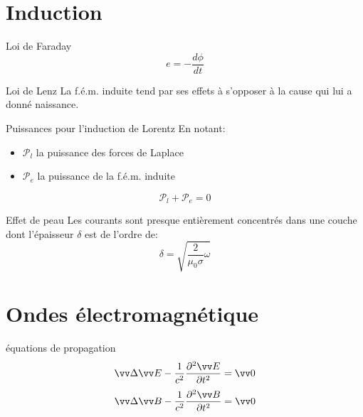 \documentclass[french, a4paper, 11pt, twocolumn]{article}
\begin{document}
\section{Induction}
\begin{cadre}{Loi de Faraday}
  \[e = -\dfrac{d\phi}{dt}\]
\end{cadre}

\begin{cadre}{Loi de Lenz}
  \og La f.é.m. induite tend par ses effets à s'opposer à la cause qui lui a donné naissance.\fg{}
\end{cadre}

\begin{cadre}{Puissances pour l'induction de Lorentz}
  En notant:
  \begin{itemize}
    \item $\mathcal{P}_{l}$ la puissance des forces de Laplace
    \item $\mathcal{P}_{e}$ la puissance de la f.é.m. induite
  \end{itemize}
  \[\mathcal{P}_{l}+\mathcal{P}_{e} = 0\]
\end{cadre}

\begin{cadre}{Effet de peau}
  Les courants sont presque entièrement concentrés dans une couche dont l'épaisseur $\delta$ est de l'ordre de:
  \[\delta = \sqrt{\dfrac{2}{\mu_{0}\sigma}\omega}\]
\end{cadre}

\section{Ondes électromagnétique}
\begin{cadre}{équations de propagation}
  \[\vv\Delta \vv E - \dfrac{1}{c^{2}}\dfrac{\partial^{2}\vv E}{\partial t^{2}} = \vv 0\]
  \[\vv\Delta \vv B - \dfrac{1}{c^{2}}\dfrac{\partial^{2}\vv B}{\partial t^{2}} = \vv 0\]
\end{cadre}
\end{document}

